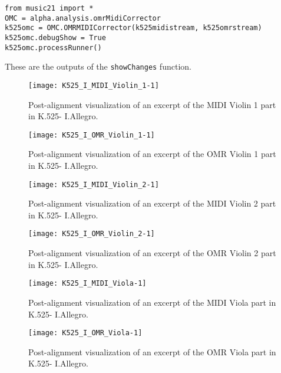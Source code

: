 \begin{verbatim}
from music21 import *
OMC = alpha.analysis.omrMidiCorrector
k525omc = OMC.OMRMIDICorrector(k525midistream, k525omrstream)
k525omc.debugShow = True
k525omc.processRunner()
\end{verbatim}

These are the outputs of the \texttt{showChanges} function.

\begin{figure}[H]
\centering
\texttt{[image: K525\_I\_MIDI\_Violin\_1-1]}
\caption[K.525- I.Allegro MIDI Violin 1 alignment]{Post-alignment visualization of an excerpt of the MIDI Violin 1 part in K.525- I.Allegro.}
\end{figure}

\begin{figure}[H]
\centering
\texttt{[image: K525\_I\_OMR\_Violin\_1-1]}
\caption[K.525- I.Allegro OMR Violin 1 alignment]{Post-alignment visualization of an excerpt of the OMR Violin 1 part in K.525- I.Allegro.}
\end{figure}

\begin{figure}[H]
\centering
\texttt{[image: K525\_I\_MIDI\_Violin\_2-1]}
\caption[K.525- I.Allegro MIDI Violin 2 alignment]{Post-alignment visualization of an excerpt of the MIDI Violin 2 part in K.525- I.Allegro.}
\end{figure}

\begin{figure}[H]
\centering
\texttt{[image: K525\_I\_OMR\_Violin\_2-1]}
\caption[K.525- I.Allegro OMR Violin 2 alignment]{Post-alignment visualization of an excerpt of the OMR Violin 2 part in K.525- I.Allegro.}
\end{figure}

\begin{figure}[H]
\centering
\texttt{[image: K525\_I\_MIDI\_Viola-1]}
\caption[K.525- I.Allegro MIDI Viola alignment]{Post-alignment visualization of an excerpt of the MIDI Viola part in K.525- I.Allegro.}
\end{figure}

\begin{figure}[H]
\centering
\texttt{[image: K525\_I\_OMR\_Viola-1]}
\caption[K.525- I.Allegro OMR Viola alignment]{Post-alignment visualization of an excerpt of the OMR Viola part in K.525- I.Allegro.}
\end{figure}

